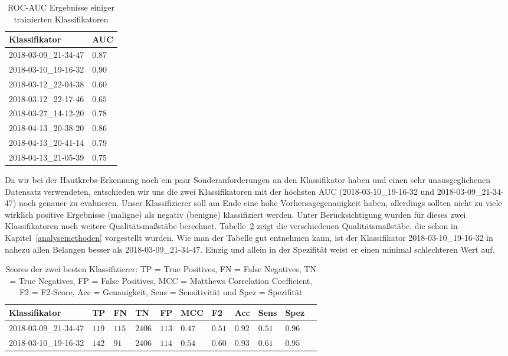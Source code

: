 \begin{table}[htb!]
\begin{center}
\begin{tabular}{ll}
	\toprule
 	Klassifikator  & AUC\\
	\midrule
  	2018-03-09\_21-34-47 &   $0.87$\\
    2018-03-10\_19-16-32 &   $0.90$\\
    2018-03-12\_22-04-38 &   $0.60$\\
    2018-03-12\_22-17-46 &   $0.65$\\
    2018-03-27\_14-12-20 &   $0.78$\\
    2018-04-13\_20-38-20 &   $0.86$\\
    2018-04-13\_20-41-14 &   $0.79$\\
    2018-04-13\_21-05-39 &   $0.75$\\
 \bottomrule
 \end{tabular}
 \end{center}
  \caption{ROC-AUC Ergebnisse einiger trainierten Klassifikatoren}
 \label{tab:auc}
 \end{table}
 
Da wir bei der Hautkrebs-Erkennung noch ein paar Sonderanforderungen an den Klassifikator haben und einen sehr unausgeglichenen Datensatz verwendeten, entschieden wir uns die zwei Klassifikatoren mit der höchsten AUC (2018-03-10\_19-16-32 und 2018-03-09\_21-34-47) noch genauer zu evaluieren. Unser Klassifizierer soll am Ende  eine hohe Vorhersagegenauigkeit haben, allerdings sollten nicht zu viele wirklich positive Ergebnisse (maligne) als negativ (benigne) klassifiziert werden. Unter Berücksichtigung wurden für dieses zwei Klassifikatoren noch weitere Qualitätsmaßstäbe berechnet. Tabelle~\ref{tab:scores} zeigt die verschiedenen Qualitätsmaßstäbe, die schon in Kapitel~\ref{analysemethoden} vorgestellt wurden. Wie man der Tabelle gut entnehmen kann, ist der Klassifikator 2018-03-10\_19-16-32 in nahezu allen Belangen besser als 2018-03-09\_21-34-47. Einzig und allein in der Spezifität weist er einen minimal schlechteren Wert auf.

\begin{table}[htb!]
\begin{center}
\begin{tabular}{lllllllllll}
	\toprule
 	Klassifikator  & TP & FN & TN & FP & MCC & F2 & Acc & Sens & Spez\\
	\midrule
	2018-03-09\_21-34-47 & $119$ &	$115$ &	$2406$ &	$113$ &	$0.47$ &	$0.51$&	$0.92$ &	$0.51$ & $0.96$\\
    2018-03-10\_19-16-32 & $142$&	$91$ &	$2406$ &	$114$ &	$0.54$ 	&$0.60$	&$0.93$	&$0.61$&	$0.95$ \\
 \bottomrule
 \end{tabular}
 \end{center}
  \caption{Scores der zwei besten Klassifizierer: TP = True Positives, FN = False Negatives, TN = True Negatives, FP = False Positives, MCC = Matthews Correlation Coefficient, F2 = F2-Score, Acc = Genauigkeit, Sens = Sensitivität und Spez = Spezifität }
 \label{tab:scores}
 \end{table}
 
